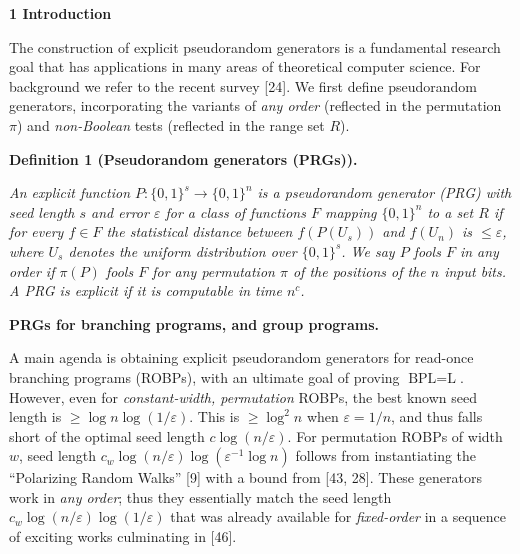 

\par\medskip\noindent\textbf{
1 Introduction}\par




The construction of explicit pseudorandom generators is a fundamental research
goal that has applications in many areas of theoretical computer science.
For background we refer to the recent survey [24].
We first define pseudorandom generators, incorporating the variants
of \emph{any order} (reflected in the permutation $\pi$) and \emph{non-Boolean} tests (reflected in the
range set $R$).\par





\par\medskip\noindent\textbf{
\textbf{Definition 1}\textbf{ }(Pseudorandom generators (PRGs))\textbf{.}
}\par



\emph{An explicit function $P\colon\{0,1\}^{s}\to\{0,1\}^{n}$ is a pseudorandom
generator (PRG) with seed length $s$ and error $\varepsilon$ for a class
of functions $F$ mapping $\{0,1\}^{n}$ to a set $R$ if for every $f\in F$ the
statistical distance between $f(P(U_{s}))$ and $f(U_{n})$ is $\leq\varepsilon$,
where $U_{s}$ denotes the uniform distribution over $\{0,1\}^{s}$. We say $P$ fools $F$ in any order if $\pi(P)$ fools $F$
for any permutation $\pi$ of the positions of the $n$ input bits.
A PRG is explicit if it is computable in time $n^{c}$.}\par






\par\medskip\noindent\textbf{PRGs for branching programs, and group programs.}\par




A main agenda is obtaining explicit pseudorandom generators for read-once branching
programs (ROBPs), with an ultimate goal of proving $\text{BPL}=\text{L}$.
However, even for \emph{constant-width, permutation }ROBPs, the best known
seed length is $\geq\log n\log(1/\varepsilon)$. This is $\geq\log^{2}n$
when $\varepsilon=1/n$, and thus falls short of the optimal seed length $c\log(n/\varepsilon)$.
For permutation ROBPs of width $w$, seed length $c_{w}\log(n/\varepsilon)\log(\varepsilon^{-1}\log n)$
follows from instantiating the “Polarizing Random Walks” [9]
with a bound from [43, 28]. These generators work in \emph{any
order}; thus they essentially match the seed length $c_{w}\log(n/\varepsilon)\log(1/\varepsilon)$
that was already available for \emph{fixed-order }in a sequence of
exciting works culminating in [46].\par




